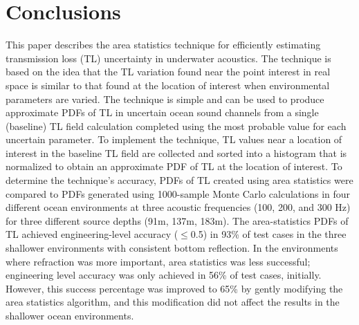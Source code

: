\section{Conclusions} \label{section:asuq_astats_conclusions}
This paper describes the area statistics technique for efficiently
estimating transmission loss (TL) uncertainty in underwater
acoustics. The technique is based on the idea that the TL variation
found near the point interest in real space is similar to that found
at the location of interest when environmental parameters are
varied. The technique is simple and can be used to produce approximate
PDFs of TL in uncertain ocean sound channels from a single (baseline)
TL field calculation completed using the most probable value for each
uncertain parameter. To implement the technique, TL values near a
location of interest in the baseline TL field are collected and sorted
into a histogram that is normalized to obtain an approximate PDF of TL
at the location of interest. To determine the technique's accuracy,
PDFs of TL created using area statistics were compared to PDFs
generated using 1000-sample Monte Carlo calculations in four different
ocean environments at three acoustic frequencies (100, 200, and 300
Hz) for three different source depths (91m, 137m, 183m). The
area-statistics PDFs of TL achieved engineering-level accuracy ($\leq$0.5)
in 93\% of test cases in the three shallower environments with
consistent bottom reflection. In the environments where refraction was
more important, area statistics was less successful; engineering level
accuracy was only achieved in 56\% of test cases, initially.  However,
this success percentage was improved to 65\% by gently modifying the
area statistics algorithm, and this modification did not affect the
results in the shallower ocean environments.

